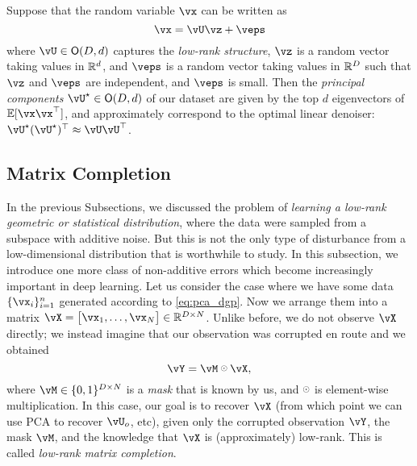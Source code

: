 \documentclass[../../book-main.tex]{subfiles}
\begin{document}
\begin{theorem}\label{thm:ppca}
    Suppose that the random variable \(\vx\) can be written as
    \begin{equation}
        \vx = \vU\vz + \veps
    \end{equation}
    where \(\vU \in \O(D, d)\) captures the \textit{low-rank structure}, \(\vz\)
    is a random vector taking values in \(\mathbb{R}^{d}\), and \(\veps\) is a random
    vector taking values in \(\mathbb{R}^{D}\) such that \(\vz\) and \(\veps\) are
    independent, and \(\veps\) is small. Then the \textit{principal components}
    \(\vU^{\star} \in \O(D, d)\) of our dataset are given by the top \(d\)
    eigenvectors of \(\Ex[\vx\vx^{\top}]\), and approximately correspond to the
    optimal linear denoiser: \(\vU^{\star}(\vU^{\star})^{\top} \approx \vU\vU^{\top}\).
\end{theorem}



\subsection{Matrix Completion}

In the previous Subsections, we discussed the problem of \textit{learning a low-rank geometric or statistical distribution}, where the data were sampled from a subspace with additive noise. But this is not the only type of disturbance from a low-dimensional distribution that is worthwhile to study. In this subsection, we introduce one more class of non-additive errors which become increasingly important in deep learning. Let us consider the case where we have some data \(\{\vx_{i}\}_{i = 1}^{n}\) generated according to \eqref{eq:pca_dgp}. Now we arrange them into a matrix \(\vX = \mat{\vx_{1}, \dots, \vx_{N}} \in \R^{D \times N}\). Unlike before, we do not observe \(\vX\) directly; we instead imagine that our observation was corrupted en route and we obtained 
\begin{equation}
    \vY = \vM \hada \vX,
\end{equation}
where \(\vM \in \{0, 1\}^{D \times N}\) is a \textit{mask} that is known by us,
and \(\hada\) is element-wise multiplication. In this case, our goal is to recover \(\vX\) (from which point we can use PCA to recover \(\vU_{o}\), etc), given only the corrupted observation \(\vY\), the mask \(\vM\), and the knowledge that \(\vX\) is (approximately) low-rank. This is called \textit{low-rank matrix completion}.
\end{document}

